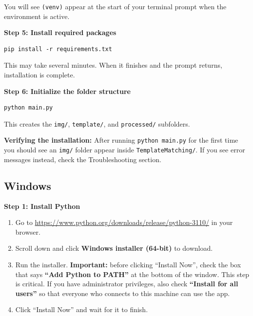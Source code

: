 \documentclass[11pt, letterpaper]{article}
\begin{document}
You will see \texttt{(venv)} appear at the start of your terminal prompt when the environment
is active.

\textbf{Step 5: Install required packages}

\begin{lstlisting}
pip install -r requirements.txt
\end{lstlisting}

This may take several minutes. When it finishes and the prompt returns, installation is complete.

\textbf{Step 6: Initialize the folder structure}

\begin{lstlisting}
python main.py
\end{lstlisting}

This creates the \texttt{img/}, \texttt{template/}, and \texttt{processed/} subfolders.

\begin{tipbox}
\textbf{Verifying the installation:} After running \texttt{python main.py} for the first time
you should see an \texttt{img/} folder appear inside \texttt{TemplateMatching/}. If you see
error messages instead, check the Troubleshooting section.
\end{tipbox}

\subsection*{Windows}

\textbf{Step 1: Install Python}

\begin{enumerate}
  \item Go to \url{https://www.python.org/downloads/release/python-3110/} in your browser.
  \item Scroll down and click \textbf{Windows installer (64-bit)} to download.
  \item Run the installer. \textbf{Important:} before clicking ``Install Now'', check the
        box that says \textbf{``Add Python to PATH''} at the bottom of the window. This
        step is critical. If you have administrator privileges, also check
        \textbf{``Install for all users''} so that everyone who connects to this machine
        can use the app.
  \item Click ``Install Now'' and wait for it to finish.
\end{enumerate}
\end{document}
